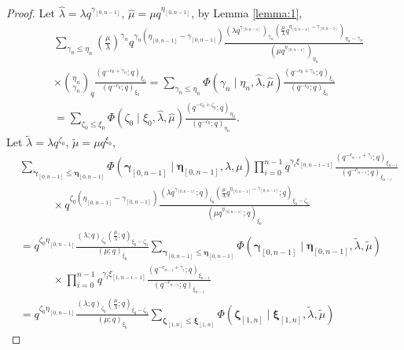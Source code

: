 \documentclass{ximera}
\begin{document}
\begin{proof}
Let $\hat{\lambda}=\lambda q^{\gamma_{[0,n-1]}}$, $\hat{\mu}=\mu q^{\eta_{[0,n-1]}}$, by Lemma \ref{lemma:1},
\begin{align*}
        &\sum_{\gamma_{n}\le \eta_{n}}\left(\frac{\mu}{\lambda}\right)^{\gamma_n}q^{\gamma_n(\eta_{[0,n-1]}-\gamma_{[0,n-1]})}\frac{(\lambda q^{\gamma_{[0,n-1]}})_{\gamma_n}(\frac{\mu}{\lambda} q^{\eta_{[0,n-1]}-\gamma_{[0,n-1]}})_{\eta_{n}-\gamma_{n}}}{(\mu q^{\eta_{[0,n-1]}})_{\eta_n}}
        \\ &\times \binom{\eta_n}{\gamma_n}_q\frac{\left(q^{-c_{0}+\gamma_{n}};q\right)_{\xi_{0}}}{\left(q^{-c_{0}};q\right)_{\xi_{0}}}
         =\sum_{\gamma_{n}\le \eta_{n}}\Phi(\gamma_n\mid\eta_n,\hat{\lambda},\hat{\mu})\frac{\left(q^{-c_{0}+\gamma_{n}};q\right)_{\xi_{0}}}{\left(q^{-c_{0}};q\right)_{\xi_{0}}}
          \\ &=\sum_{\zeta_0\le \xi_{0}}\Phi(\zeta_0\mid\xi_{0},\hat{\lambda},\hat{\mu})\frac{\left(q^{-c_{0}+\zeta_0};q\right)_{\eta_n}}{\left(q^{-c_{0}};q\right)_{\eta_n}}.  
\end{align*}
Let $\tilde{\lambda}=\lambda q^{\zeta_0}$,  $\tilde{\mu}=\mu q^{\xi_0}$,
\begin{align*}
&\sum_{\boldsymbol\gamma_{[0,n-1]}\le \boldsymbol\eta_{[0,n-1]}}\Phi(\boldsymbol\gamma_{[0,n-1]}\mid\boldsymbol\eta_{[0,n-1]},\lambda,\mu)\prod_{i=0}^{n-1}q^{\gamma_i\xi_{[0,n-i-1]}}\frac{\left(q^{-c_{n-i}+\gamma_{i}};q\right)_{\xi_{n-i}}}{\left(q^{-c_{n-i}};q\right)_{\xi_{n-i}}}\\
         &\quad \quad \quad \times q^{\zeta_0(\eta_{[0,n-1]}-\gamma_{[0,n-1]})}\frac{(\lambda q^{\gamma_{[0,n-1]}};q)_{\zeta_0}(\frac{\mu}{\lambda} q^{\eta_{[0,n-1]}-\gamma_{[0,n-1]}};q)_{\xi_{0}-\zeta_0}}{(\mu q^{\eta_{[0,n-1]}};q)_{\xi_{0}}}\\
       & = q^{\zeta_0\eta_{[0,n-1]}}\frac{(\lambda;q)_{\zeta_0}(\frac{\mu}{\lambda};q)_{\xi_0-\zeta_0}}{(\mu;q)_{\xi_0}}
        \sum_{\boldsymbol\gamma_{[0,n-1]}\le \boldsymbol\eta_{[0,n-1]}}\Phi(\boldsymbol\gamma_{[0,n-1]}\mid\boldsymbol\eta_{[0,n-1]},\tilde{\lambda},\tilde{\mu})
        \\
        &\quad \quad \quad \times \prod_{i=0}^{n-1}q^{\gamma_i\xi_{[1,n-i-1]}}\frac{\left(q^{-c_{n-i}+\gamma_{i}};q\right)_{\xi_{n-i}}}{\left(q^{-c_{n-i}};q\right)_{\xi_{n-i}}}\\
       & =q^{\zeta_0\eta_{[0,n-1]}}\frac{(\lambda;q)_{\zeta_0}(\frac{\mu}{\lambda};q)_{\xi_0-\zeta_0}}{(\mu;q)_{\xi_0}}\sum_{\boldsymbol\zeta_{[1,n]}\le \boldsymbol\xi_{[1,n]}}\Phi(\boldsymbol\zeta_{[1,n]}\mid\boldsymbol\xi_{[1,n]},\tilde{\lambda},\tilde{\mu})

\end{align*}
\end{proof}
\end{document}
